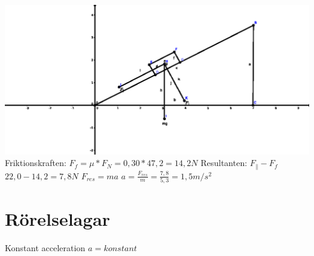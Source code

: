 \documentclass[a4paper,11pt]{article}
\begin{document}
\begin{flushleft}
\includegraphics{trigonometri.eps}\newline
Friktionskraften:\newline
$ F_f = \mu * F_N = 0,30 * 47,2 = 14,2 N $\newline
Resultanten: $ F_{\parallel} - F_f $\newline
$ 22,0 - 14,2 = 7,8 N $\newline
$ F_{res} = ma $\newline
$ a = \frac{F_{res}}{m} = \frac{7,8}{5,3} = 1,5 m/s^2 $\newline
\section{Rörelselagar}
Konstant acceleration\newline
$ a = konstant $\newline


\end{flushleft}
\end{document}
